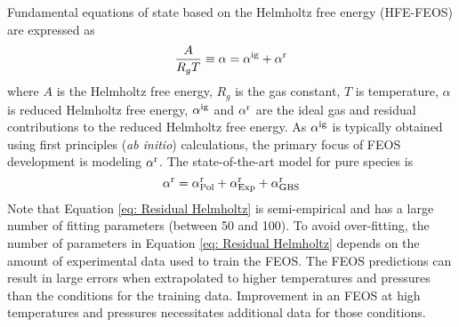 \documentclass[11pt,a4paper]{article}
\begin{document}
Fundamental equations of state based on the Helmholtz free energy (HFE-FEOS) are expressed as 
\begin{equation}
\frac{A}{R_gT} \equiv \alpha = \alpha^{\rm ig} + \alpha^{\rm r}
\end{equation} 
where $A$ is the Helmholtz free energy, $R_g$ is the gas constant, $T$ is temperature, $\alpha$ is reduced Helmholtz free energy, $\alpha^{\rm ig}$ and $\alpha^{\rm r}$ are the ideal gas and residual contributions to the reduced Helmholtz free energy. As $\alpha^{\rm ig}$ is typically obtained using first principles (\textit{ab initio}) calculations, the primary focus of FEOS development is modeling $\alpha^{\rm r}$. The state-of-the-art model for pure species is  
\begin{equation} \label{eq: Residual Helmholtz}
\alpha^{\rm r} = \alpha_{\rm Pol}^{\rm r} + \alpha_{\rm Exp}^{\rm r} + \alpha_{\rm GBS}^{\rm r}
\end{equation}
Note that Equation \ref{eq: Residual Helmholtz} is semi-empirical and has a large number of fitting parameters (between 50 and 100). To avoid over-fitting, the number of parameters in Equation \ref{eq: Residual Helmholtz} depends on the amount of experimental data used to train the FEOS. The FEOS predictions can result in large errors when extrapolated to higher temperatures and pressures than the conditions for the training data. Improvement in an FEOS at high temperatures and pressures necessitates additional data for those conditions.

\end{document}
